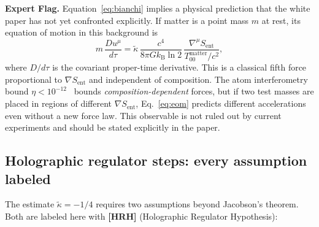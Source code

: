 \documentclass[12pt,letterpaper]{article}
\theoremstyle{plain}
\theoremstyle{definition}
\theoremstyle{remark}
\newenvironment{expertflag}{%
  \begin{mdframed}[backgroundcolor=boxgray,linecolor=flagred,linewidth=1.2pt]
  \noindent\textcolor{flagred}{\textbf{Expert Flag.}}\quad}{%
  \end{mdframed}}
\newcommand{\kB}{k_{\mathrm{B}}}
\newcommand{\kt}{\tilde{\kappa}}
\newcommand{\Sent}{S_{\mathrm{ent}}}
\begin{document}
\begin{expertflag}
Equation~\eqref{eq:bianchi} implies a physical prediction that the white paper
has not yet confronted explicitly.  If matter is a point mass $m$ at rest, its equation
of motion in this background is
\begin{equation}
  m\,\frac{Du^\mu}{d\tau}
  = \kt\,\frac{c^4}{8\pi G\kB\ln 2}\,\frac{\nabla^\mu\Sent}{T^{\mathrm{matter}}_{00}/c^2},
  \label{eq:eom}
\end{equation}
where $D/d\tau$ is the covariant proper-time derivative.  This is a classical fifth force
proportional to $\nabla\Sent$ and independent of composition.  The atom interferometry
bound $\eta < 10^{-12}$~\cite{Asenbaum2020} bounds \emph{composition-dependent} forces,
but if two test masses are placed in regions of different $\nabla\Sent$,
Eq.~\eqref{eq:eom} predicts different accelerations even without a new force law.
This observable is not ruled out by current experiments and should be
stated explicitly in the paper.
\end{expertflag}

\subsection{Holographic regulator steps: every assumption labeled}

The estimate $\kt = -1/4$ requires two assumptions beyond Jacobson's theorem.
Both are labeled here with \textbf{[HRH]} (Holographic Regulator Hypothesis):
\end{document}
